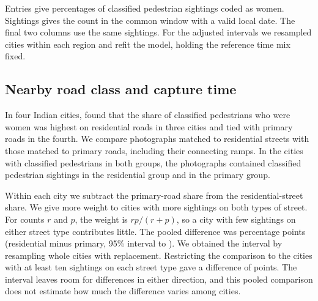 \documentclass[11pt]{article}
\begin{document}
\begin{table}[!ht]
\centering\footnotesize
\caption{Regional pedestrian shares before and after adjustment for capture time.}
\label{tab:regional_timing}
\begin{threeparttable}

\begin{tablenotes}[flushleft]\footnotesize
\item Entries give percentages of classified pedestrian sightings coded as women. Sightings gives the count in the common window with a valid local date. The final two columns use the same sightings. For the adjusted intervals we resampled cities within each region and refit the model, holding the reference time mix fixed.
\end{tablenotes}
\end{threeparttable}
\end{table}

\clearpage
\subsection{Nearby road class and capture time}
In four Indian cities, \citet{karekurve2026streetscope} found that the share of classified pedestrians who were women was highest on residential roads in three cities and tied with primary roads in the fourth. We compare photographs matched to residential streets with those matched to primary roads, including their connecting ramps. In the \RoadPairedCities{} cities with classified pedestrians in both groups, the photographs contained \RoadResidentialN{} classified pedestrian sightings in the residential group and \RoadPrimaryN{} in the primary group.

Within each city we subtract the primary-road share from the residential-street share. We give more weight to cities with more sightings on both types of street. For counts $r$ and $p$, the weight is $rp/(r+p)$, so a city with few sightings on either street type contributes little. The pooled difference was \RoadDifference{} percentage points (residential minus primary, 95\% interval \RoadLower{} to \RoadUpper{}). We obtained the interval by resampling whole cities with replacement. Restricting the comparison to the \RoadCheckCities{} cities with at least ten sightings on each street type gave a difference of \RoadCheckDifference{} points. The interval leaves room for differences in either direction, and this pooled comparison does not estimate how much the difference varies among cities.
\end{document}
